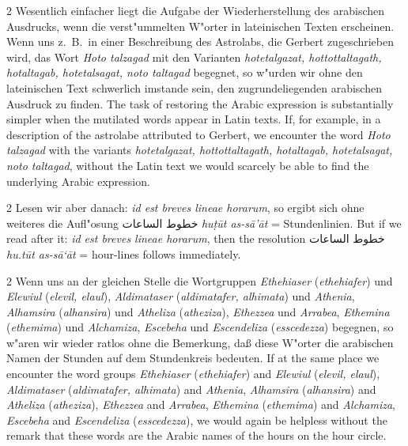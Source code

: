 \documentclass[10pt,a4paper]{article}
\renewcommand{\switchcolumn}{\syncronize\nointerlineskip\columnbreak}
\newcommand{\RL}[1]{\beginR#1\endR}
\newcommand{\ar}[1]{{\arabicfont\RL{#1}}}
\begin{document}
\begin{paracol}{2}
Wesentlich einfacher liegt die Aufgabe der Wiederherstellung des arabischen Ausdrucks, wenn die verst"ummelten W"orter in lateinischen Texten erscheinen. Wenn uns z.\ B.\ in einer Beschreibung des Astrolabs, die Gerbert zugeschrieben wird, das Wort \textit{Hoto talzagad} mit den Varianten \textit{hotetalgazat, hottottaltagath, hotaltagab, hotetalsagat, noto taltagad} begegnet, so w"urden wir ohne den lateinischen Text schwerlich imstande sein, den zugrundeliegenden arabischen Ausdruck zu finden.
\switchcolumn
The task of restoring the Arabic expression is substantially simpler when the mutilated words appear in Latin texts. If, for example, in a description of the astrolabe attributed to Gerbert, we encounter the word \textit{Hoto talzagad} with the variants \textit{hotetalgazat, hottottaltagath, hotaltagab, hotetalsagat, noto taltagad}, without the Latin text we would scarcely be able to find the underlying Arabic expression.
\end{paracol}

\begin{paracol}{2}
Lesen wir aber danach: \textit{id est breves lineae horarum}, so ergibt sich ohne weiteres die Aufl"osung \ar{خطوط الساعات} \textit{hu\d{t}\=ut as-s\=a'\=at} = Stundenlinien.
\switchcolumn
But if we read after it: \textit{id est breves lineae horarum}, then the resolution \ar{خطوط الساعات} \textit{hu.t\=ut as-s\=a`\=at} = hour-lines follows immediately.
\end{paracol}

\begin{paracol}{2}
Wenn uns an der gleichen Stelle die Wortgruppen \textit{Ethehiaser} (\textit{ethehiafer}) und \textit{Elewiul} (\textit{elevil, elaul}), \textit{Aldimataser} (\textit{aldimatafer, alhimata}) und \textit{Athenia}, \textit{Alhamsira} (\textit{alhansira}) und \textit{Atheliza} (\textit{atheziza}), \textit{Ethezzea} und \textit{Arrabea}, \textit{Ethemina} (\textit{ethemima}) und \textit{Alchamiza}, \textit{Escebeha} und \textit{Escendeliza} (\textit{esscedezza}) begegnen, so w"aren wir wieder ratlos ohne die Bemerkung, da\ss{} diese W"orter die arabischen Namen der Stunden auf dem Stundenkreis bedeuten.
\switchcolumn
If at the same place we encounter the word groups \textit{Ethehiaser} (\textit{ethehiafer}) and \textit{Elewiul} (\textit{elevil, elaul}), \textit{Aldimataser} (\textit{aldimatafer, alhimata}) and \textit{Athenia}, \textit{Alhamsira} (\textit{alhansira}) and \textit{Atheliza} (\textit{atheziza}), \textit{Ethezzea} and \textit{Arrabea}, \textit{Ethemina} (\textit{ethemima}) and \textit{Alchamiza}, \textit{Escebeha} and \textit{Escendeliza} (\textit{esscedezza}), we would again be helpless without the remark that these words are the Arabic names of the hours on the hour circle.
\end{paracol}
\end{document}
